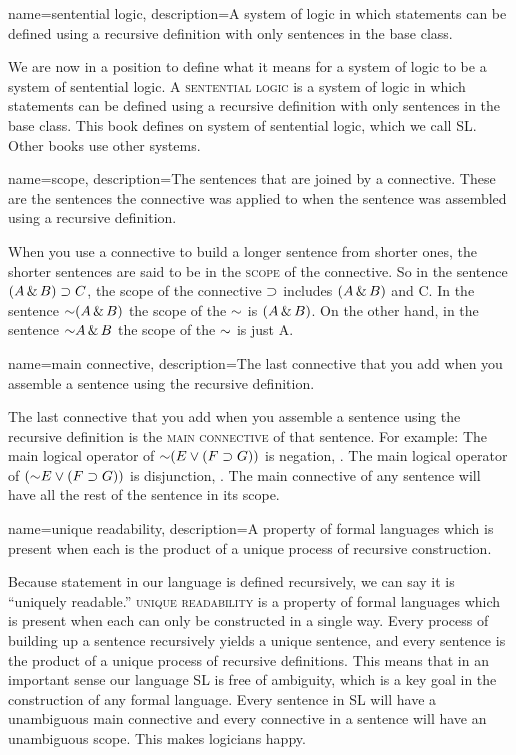 {
name=sentential logic,
description={A system of logic in which statements can be defined using a recursive definition with only sentences in the base class.}
}


We are now in a position to define what it means for a system of logic to be a system of sentential logic. A \textsc{\gls{sentential logic}} \label{def:sentential_logic} is a system of logic in which statements can be defined using a recursive definition with only sentences in the base class. This book defines on system of sentential logic, which we call SL. Other books use other systems.


{
name=scope,
description={The sentences that are joined by a connective. These are the sentences the connective was applied to when the sentence was assembled using a recursive definition.}
}

When you use a connective to build a longer sentence from shorter ones, the shorter sentences are said to be in the \textsc{\gls{scope}} \label{def:scope} of the connective. So in the sentence $(A \,\&\, B) \supset C$, the scope of the connective $\supset$ includes $(A \,\&\, B)$ and C. In the sentence $\mathord{\sim}(A \,\&\, B)$ the scope of the $\mathord{\sim}$ is $(A \,\&\, B)$. On the other hand, in the sentence $\mathord{\sim} A \,\&\, B$ the scope of the $\mathord{\sim}$ is just A.

{
name=main connective,
description={The last connective that you add when you assemble a sentence using the recursive definition.}
}

The last connective that you add when you assemble a sentence using the recursive definition is the \textsc{\gls{main connective}} \label{def:main_connective} of that sentence. For example: The main logical operator of $\mathord{\sim} (E \vee (F \supset G))$ is negation, \enot. The main logical operator of $(\mathord{\sim} E \vee (F \supset G))$ is disjunction, \eor. The main connective of any sentence will have all the rest of the sentence in its scope.

{
name=unique readability,
description={A property of formal languages which is present when each  is the product of a unique process of recursive construction.}
}

Because statement in our language is defined recursively, we can say it is ``uniquely readable.'' \textsc{\Gls{unique readability}}\label{def:unique_readability} is a property of formal languages which is present when each  can only be constructed in a single way. Every process of building up a sentence recursively yields a unique sentence, and every sentence is the product of a unique process of recursive definitions. This means that in an important sense our language SL is free of ambiguity, which is a key goal in the construction of any formal language. Every sentence in SL will have a unambiguous main connective and every connective in a sentence will have an unambiguous scope. This makes logicians happy.


